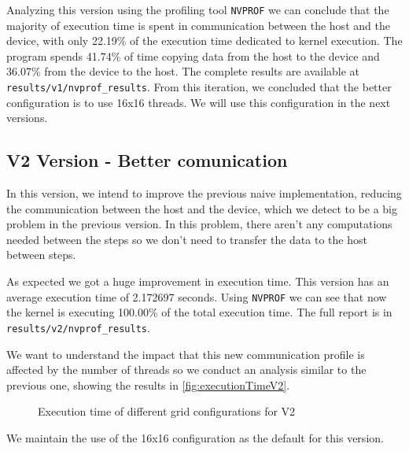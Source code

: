 \documentclass[conference]{IEEEtran}
\begin{document}
Analyzing this version using the profiling tool \texttt{NVPROF} we can conclude that the majority of execution time is spent in communication between the host and the device, with only  22.19\% of the execution time dedicated to kernel execution. The program spends 41.74\% of time copying data from the host to the device and 36.07\% from the device to the host. The complete results are available at \texttt{results/v1/nvprof\_results}.
From this iteration, we concluded that the better configuration is to use 16x16 threads. We will use this configuration in the next versions.

\subsection{V2 Version - Better comunication}
In this version, we intend to improve the previous naive implementation, reducing the communication between the host and the device, which we detect to be a big problem in the previous version. In this problem, there aren't any computations needed between the steps so we don't need to transfer the data to the host between steps.

As expected we got a huge improvement in execution time. This version has an average execution time of 2.172697 seconds. Using \texttt{NVPROF} we can see that now the kernel is executing 100.00\% of the total execution time. The full report is in \texttt{results/v2/nvprof\_results}.

We want to understand the impact that this new communication profile is affected by the number of threads so we conduct an analysis similar to the previous one, showing the results in \autoref{fig:executionTimeV2}.

\begin{figure}[ht]
  \centering
  \caption{Execution time of different grid configurations for V2}
  \label{fig:executionTimeV2}
\end{figure}
We maintain the use of the 16x16 configuration as the default for this version.
\end{document}
